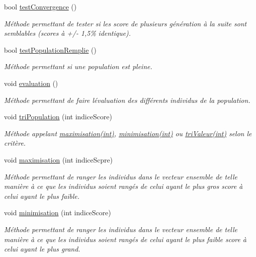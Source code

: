 \begin{DoxyCompactItemize}
bool \hyperlink{class_population_ae3511322c007fc85a8dd9bda0693b9cf}{test\+Convergence} ()
\begin{DoxyCompactList}\small\item\em Méthode permettant de tester si les score de plusieurs génération à la suite sont semblables (scores à +/-\/ 1,5\% identique). \end{DoxyCompactList}\item 
bool \hyperlink{class_population_a70cec52ba5d29e0f4a1a67a4ae52b276}{test\+Population\+Remplie} ()
\begin{DoxyCompactList}\small\item\em Méthode permettant si une population est pleine. \end{DoxyCompactList}\item 
\mbox{\label{class_population_a023ecf9c1f66140c8b42b4e2bc9755a9}} 
void \hyperlink{class_population_a023ecf9c1f66140c8b42b4e2bc9755a9}{evaluation} ()
\begin{DoxyCompactList}\small\item\em Méthode permettant de faire l\textquotesingle{}évaluation des différents individus de la population. \end{DoxyCompactList}\item 
void \hyperlink{class_population_a15c4b45d033b6af3765f5e86ce43f232}{tri\+Population} (int indice\+Score)
\begin{DoxyCompactList}\small\item\em Méthode appelant \hyperlink{class_population_ae240b80ad4eae0f1b2ec5ec1edcd88c3}{maximisation(int)}, \hyperlink{class_population_a6f27e76b6b15668b343c43c56027515d}{minimisation(int)} ou \hyperlink{class_population_a4b167d07f145a1f1ea69b2bb4cfd2cfb}{tri\+Valeur(int)} selon le critère. \end{DoxyCompactList}\item 
void \hyperlink{class_population_ae240b80ad4eae0f1b2ec5ec1edcd88c3}{maximisation} (int indice\+Scpre)
\begin{DoxyCompactList}\small\item\em Méthode permettant de ranger les individus dans le vecteur ensemble de telle manière à ce que les individus soient rangés de celui ayant le plus gros score à celui ayant le plus faible. \end{DoxyCompactList}\item 
void \hyperlink{class_population_a6f27e76b6b15668b343c43c56027515d}{minimisation} (int indice\+Score)
\begin{DoxyCompactList}\small\item\em Méthode permettant de ranger les individus dans le vecteur ensemble de telle manière à ce que les individus soient rangés de celui ayant le plus faible score à celui ayant le plus grand. \end{DoxyCompactList}\item 

\end{DoxyCompactItemize}
